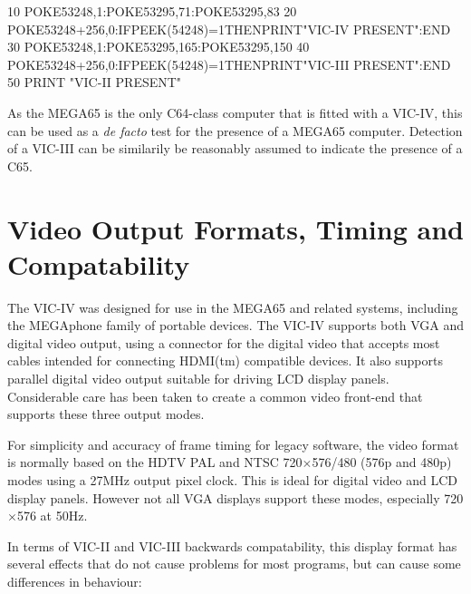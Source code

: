\begin{screenoutput}
10 POKE53248,1:POKE53295,71:POKE53295,83
20 POKE53248+256,0:IFPEEK(54248)=1THENPRINT"VIC-IV PRESENT":END
30 POKE53248,1:POKE53295,165:POKE53295,150
40 POKE53248+256,0:IFPEEK(54248)=1THENPRINT"VIC-III PRESENT":END
50 PRINT "VIC-II PRESENT"
\end{screenoutput}
   
As the MEGA65 is the only C64-class computer that is fitted with a VIC-IV, this can be used as a {\em de facto} test for the presence
of a MEGA65 computer. Detection of a VIC-III can be similarily be reasonably assumed to indicate the presence of a C65.

\section{Video Output Formats, Timing and Compatability}

The VIC-IV was designed for use in the MEGA65 and related systems, including the MEGAphone family of portable devices.
The VIC-IV supports both VGA and digital video output, using a connector for the digital video that accepts most cables intended
for connecting HDMI(tm) compatible devices.  It also supports parallel digital video output suitable for driving LCD display
panels.  Considerable care has been taken to create a common video front-end that supports these three output modes.

For simplicity and accuracy of frame timing for legacy software, the video format is normally based on the HDTV PAL and NTSC 720$\times$576/480 (576p and 480p) modes using a 27MHz output pixel clock.  This is ideal for digital video and LCD display panels. However not all VGA displays support
these modes, especially 720$\times$576 at 50Hz.

In terms of VIC-II and VIC-III backwards compatability, this display format has several effects that do not cause problems for most programs, but can cause some differences in behaviour:

